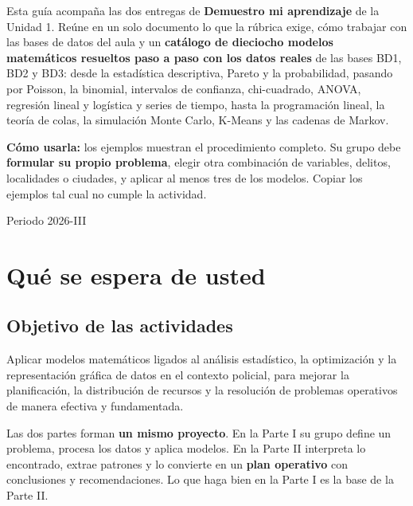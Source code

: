 \begin{titlepage}
\vfill

\begin{cajaInfo}
Esta guía acompaña las dos entregas de \textbf{Demuestro mi aprendizaje} de la Unidad 1.
Reúne en un solo documento lo que la rúbrica exige, cómo trabajar con las bases de datos
del aula y un \textbf{catálogo de dieciocho modelos matemáticos resueltos paso a paso con los
datos reales} de las bases BD1, BD2 y BD3: desde la estadística descriptiva, Pareto y la
probabilidad, pasando por Poisson, la binomial, intervalos de confianza, chi-cuadrado,
ANOVA, regresión lineal y logística y series de tiempo, hasta la programación lineal,
la teoría de colas, la simulación Monte Carlo, K-Means y las cadenas de Markov.

\textbf{Cómo usarla:} los ejemplos muestran el procedimiento completo. Su grupo debe
\textbf{formular su propio problema}, elegir otra combinación de variables, delitos,
localidades o ciudades, y aplicar al menos tres de los modelos. Copiar los ejemplos tal
cual no cumple la actividad.
\end{cajaInfo}

\vspace{0.4cm}
{\footnotesize \color{policiaAzul} Periodo 2026-III}
\end{titlepage}

\tableofcontents
\newpage

\section{Qué se espera de usted}

\subsection{Objetivo de las actividades}
\begin{cajaInfo}
Aplicar modelos matemáticos ligados al análisis estadístico, la optimización y la
representación gráfica de datos en el contexto policial, para mejorar la planificación,
la distribución de recursos y la resolución de problemas operativos de manera efectiva y
fundamentada.
\end{cajaInfo}

Las dos partes forman \textbf{un mismo proyecto}. En la Parte I su grupo define un
problema, procesa los datos y aplica modelos. En la Parte II interpreta lo encontrado,
extrae patrones y lo convierte en un \textbf{plan operativo} con conclusiones y
recomendaciones. Lo que haga bien en la Parte I es la base de la Parte II.


